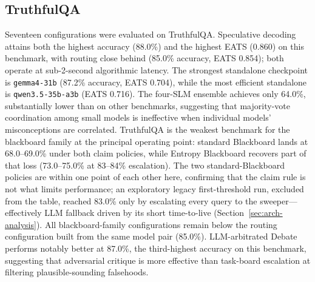 \subsection{TruthfulQA}

Seventeen configurations were evaluated on TruthfulQA. Speculative decoding attains both the highest accuracy (88.0\%) and the highest EATS (0.860) on this benchmark, with routing close behind (85.0\% accuracy, EATS 0.854); both operate at sub-2-second algorithmic latency. The strongest standalone checkpoint is \texttt{gemma4-31b} (87.2\% accuracy, EATS 0.704), while the most efficient standalone is \texttt{qwen3.5-35b-a3b} (EATS 0.716). The four-SLM ensemble achieves only 64.0\%, substantially lower than on other benchmarks, suggesting that majority-vote coordination among small models is ineffective when individual models' misconceptions are correlated. TruthfulQA is the weakest benchmark for the blackboard family at the principal operating point: standard Blackboard lands at 68.0--69.0\% under both claim policies, while Entropy Blackboard recovers part of that loss (73.0--75.0\% at 83--84\% escalation). The two standard-Blackboard policies are within one point of each other here, confirming that the claim rule is not what limits performance; an exploratory legacy first-threshold run, excluded from the table, reached 83.0\% only by escalating every query to the sweeper---effectively LLM fallback driven by its short time-to-live (Section~\ref{sec:arch-analysis}). All blackboard-family configurations remain below the routing configuration built from the same model pair (85.0\%). LLM-arbitrated Debate performs notably better at 87.0\%, the third-highest accuracy on this benchmark, suggesting that adversarial critique is more effective than task-board escalation at filtering plausible-sounding falsehoods.

